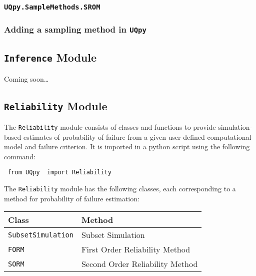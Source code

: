 \documentclass[./UsersGuide.tex]{subfiles}
\begin{document}

\subsubsection{\texttt{UQpy.SampleMethods.SROM}}



\subsubsection{Adding a sampling method in \texttt{UQpy}}


\subsection{\texttt{Inference} Module}

Coming soon\dots


\subsection{\texttt{Reliability} Module}

The \texttt{Reliability} module consists of classes and functions to provide simulation-based estimates of probability of failure from a given user-defined computational model and failure criterion. It is imported in a python script using the following command:

\vspace{4mm}
\texttt{{\color{blue} from} \texttt{UQpy} {\color{blue} import} Reliability }
\vspace{4mm}

\noindent
The \texttt{Reliability} module has the following classes, each corresponding to a method for probability of failure estimation:

\vspace{4mm}
\begin{center}
	\begin{tabular}{ |l|l| } 
		\hline
		\textbf{Class} &  \textbf{Method} \\
		\hline
		\texttt{SubsetSimulation}&  Subset Simulation  \\ 
		\hline
		\texttt{FORM}&  First Order Reliability Method  \\ 
		\hline
		\texttt{SORM}& Second Order Reliability Method  \\ 
		\hline
	\end{tabular}
\end{center}
\vspace{4mm}
\end{document}
